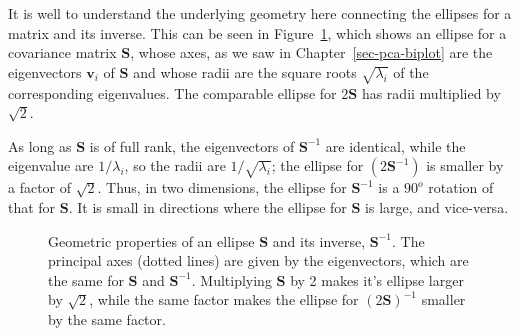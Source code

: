 \documentclass[
  letterpaper,
  10pt,
  krantz2]{krantz}
\begin{document}
It is well to understand the underlying geometry here connecting the
ellipses for a matrix and its inverse. This can be seen in
Figure~\ref{fig-inverse}, which shows an ellipse for a covariance matrix
\(\mathbf{S}\), whose axes, as we saw in Chapter~\ref{sec-pca-biplot}
are the eigenvectors \(\mathbf{v}_i\) of \(\mathbf{S}\) and whose radii
are the square roots \(\sqrt{\lambda_i}\) of the corresponding
eigenvalues. The comparable ellipse for \(2 \mathbf{S}\) has radii
multiplied by \(\sqrt{2}\).

As long as \(\mathbf{S}\) is of full rank, the eigenvectors of
\(\mathbf{S}^{-1}\) are identical, while the eigenvalue are
\(1 / \lambda_i\), so the radii are \(1 / \sqrt{\lambda_i}\); the
ellipse for \((2 \mathbf{S}^{-1})\) is smaller by a factor of
\(\sqrt{2}\). Thus, in two dimensions, the ellipse for
\(\mathbf{S}^{-1}\) is a \(90^o\) rotation of that for \(\mathbf{S}\).
It is small in directions where the ellipse for \(\mathbf{S}\) is large,
and vice-versa.

\begin{figure}


\caption{\label{fig-inverse}Geometric properties of an ellipse
\(\mathbf{S}\) and its inverse, \(\mathbf{S}^{-1}\). The principal axes
(dotted lines) are given by the eigenvectors, which are the same for
\(\mathbf{S}\) and \(\mathbf{S}^{-1}\). Multiplying \(\mathbf{S}\) by 2
makes it's ellipse larger by \(\sqrt{2}\), while the same factor makes
the ellipse for \((2 \mathbf{S})^{-1}\) smaller by the same factor.}

\end{figure}%
\end{document}
